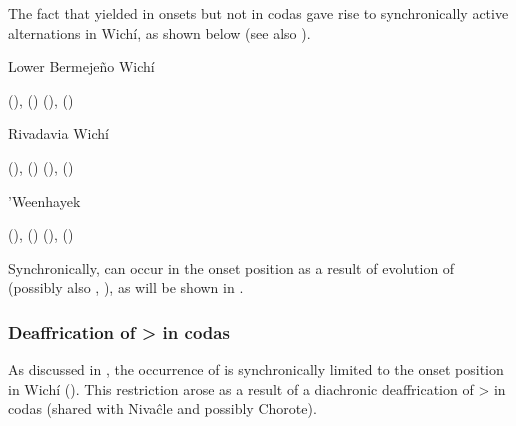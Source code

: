 \begin{exe}
    \ex \companion
    \ex \lizard
    \ex \spouse
    \ex \goimp
    \ex \frog
    \ex \fox
    \ex \moon
    \ex \lessergrison
\end{exe}

The fact that  yielded  in onsets but not in codas gave rise to synchronically active alternations in Wichí, as shown below (see also \cites[21]{KC94}).

\ea\label{ex:j-h:lbw}
Lower Bermejeño Wichí \citep[191]{VN14}\\
    \begin{xlist}
        \ex {} (\SG),  (\PL)
        \ex {} (\SG),  (\PL)
    \end{xlist}
\z

\newpage
\ea\label{ex:j-h:riv}
Rivadavia Wichí \citep[44]{JT09-th}\\
    \begin{xlist}
        \ex {} (\SG),  (\PL)
        \ex {} (\SG),  (\PL)
    \end{xlist}
\z

\ea\label{ex:j-h:whk}
’Weenhayek \citep[95, 271]{KC16}\\
    \begin{xlist}
        \ex {} (\SG),  (\PL)
        \ex {} (\SG),  (\PL)
    \end{xlist}
\z
{}

Synchronically,  can occur in the onset position as a result of evolution of  (possibly also , ), as will be shown in .

\subsubsection{Deaffrication of  >  in codas}\label{wi-ts-s}

As discussed in , the occurrence of  is synchronically limited to the onset position in Wichí (\cites[15]{KC94}[42]{JT09-th}[50]{VN14}). This restriction arose as a result of a diachronic deaffrication of  >  in codas (shared with Nivaĉle and possibly Chorote).

